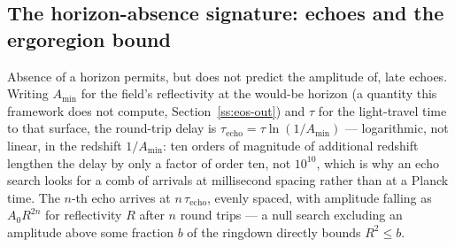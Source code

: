 \documentclass[aps,prd,twocolumn,superscriptaddress,nofootinbib]{revtex4-2}
\begin{document}
\subsection{The horizon-absence signature: echoes and the ergoregion bound}\label{ss:echo}

Absence of a horizon permits, but does not predict the amplitude of, late
echoes. Writing $A_{\min}$ for the field's reflectivity at the would-be
horizon (a quantity this framework does not compute, Section~\ref{ss:eos-out})
and $\tau$ for the light-travel time to that surface, the round-trip
delay is $\tau_{\text{echo}}=\tau\ln(1/A_{\min})$ — logarithmic, not
linear, in the redshift $1/A_{\min}$: ten orders of magnitude of
additional redshift lengthen the delay by only a factor of order ten, not
$10^{10}$, which is why an echo search looks for a comb of arrivals at
millisecond spacing rather than at a Planck time. The $n$-th echo arrives
at $n\,\tau_{\text{echo}}$, evenly spaced, with amplitude falling as
$A_0 R^{2n}$ for reflectivity $R$ after $n$ round trips — a null search
excluding an amplitude above some fraction $b$ of the ringdown directly
bounds $R^2 \leq b$.
\end{document}
